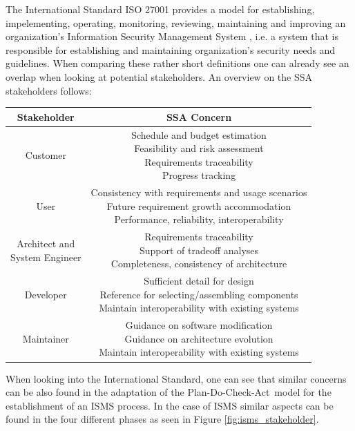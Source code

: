 The International Standard ISO 27001 provides a model for establishing, impelementing, operating, monitoring, reviewing, maintaining and improving an organization's Information Security Management System \cite{iso27001}, i.e. a system that is responsible for establishing and maintaining organization's security needs and guidelines. When comparing these rather short definitions one can already see an overlap when looking at potential stakeholders. An overview on the SSA stakeholders follows:

\begin{tabular}{|c|c|}
\hline
Stakeholder & SSA Concern \\
\hline
Customer & \makecell{Schedule and budget estimation \\ Feasibility and risk assessment \\ Requirements traceability \\ Progress tracking} \\
\hline
User & \makecell{Consistency with requirements and usage scenarios \\ Future requirement growth accommodation \\ Performance, reliability, interoperability} \\
\hline
\makecell{Architect and \\ System Engineer} & \makecell{Requirements traceability \\ Support of tradeoff analyses \\ Completeness, consistency of architecture} \\
\hline
Developer & \makecell{Sufficient detail for design \\ Reference for selecting/assembling components \\ Maintain interoperability with existing systems} \\
\hline
Maintainer & \makecell{Guidance on software modification \\ Guidance on architecture evolution \\ Maintain interoperability with existing systems} \\
\hline
\end{tabular}      
\vspace{3mm}

When looking into the International Standard, one can see that similar concerns can be also found in the adaptation of the \glqq Plan-Do-Check-Act\grqq \ model for the establishment of an ISMS process. In the case of ISMS similar aspects can be found in the four different phases as seen in Figure \ref{fig:isms_stakeholder}. 


